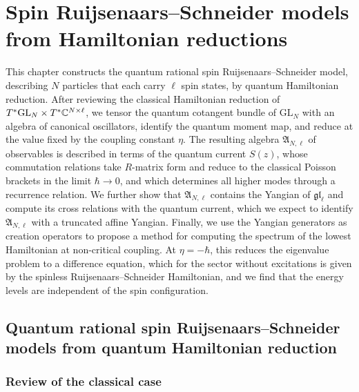
\chapter{Spin Ruijsenaars--Schneider models from Hamiltonian reductions} \label{chap:spinRSRed}

\begin{chapterabstract}
	This chapter constructs the quantum rational spin Ruijsenaars--Schneider model, describing $N$ particles that each carry $\ell$ spin states, by quantum Hamiltonian reduction. After reviewing the classical Hamiltonian reduction of $T^*\mathrm{GL}_N \times T^*\mathbb{C}^{N \times \ell}$, we tensor the quantum cotangent bundle of $\mathrm{GL}_N$ with an algebra of canonical oscillators, identify the quantum moment map, and reduce at the value fixed by the coupling constant $\eta$. The resulting algebra $\mathfrak{A}_{N,\ell}$ of observables is described in terms of the quantum current $S(z)$, whose commutation relations take $R$-matrix form and reduce to the classical Poisson brackets in the limit $\hbar \to 0$, and which determines all higher modes through a recurrence relation. We further show that $\mathfrak{A}_{N,\ell}$ contains the Yangian of $\mathfrak{gl}_\ell$ and compute its cross relations with the quantum current, which we expect to identify $\mathfrak{A}_{N,\ell}$ with a truncated affine Yangian. Finally, we use the Yangian generators as creation operators to propose a method for computing the spectrum of the lowest Hamiltonian at non-critical coupling. At $\eta = -\hbar$, this reduces the eigenvalue problem to a difference equation, which for the sector without excitations is given by the spinless Ruijsenaars--Schneider Hamiltonian, and we find that the energy levels are independent of the spin configuration.
\end{chapterabstract}

\section{Quantum rational spin Ruijsenaars--Schneider models from quantum Hamiltonian reduction}

\subsection{Review of the classical case} \label{subsection:reviewClassicalRat}

